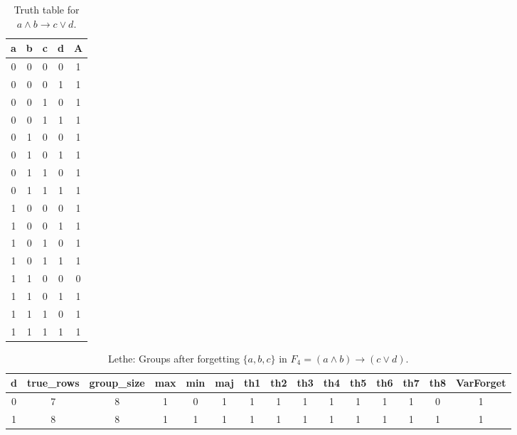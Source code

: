 \begin{table}[!tb]
    \centering
    \begin{tabular}{|c|c|c|c|c|}
        \hline
        \textbf{a} & \textbf{b} & \textbf{c} & \textbf{d} & \textbf{A} \\ \hline
        0 & 0 & 0 & 0 & 1 \\ \hline
        0 & 0 & 0 & 1 & 1 \\ \hline
        0 & 0 & 1 & 0 & 1 \\ \hline
        0 & 0 & 1 & 1 & 1 \\ \hline
        0 & 1 & 0 & 0 & 1 \\ \hline
        0 & 1 & 0 & 1 & 1 \\ \hline
        0 & 1 & 1 & 0 & 1 \\ \hline
        0 & 1 & 1 & 1 & 1 \\ \hline
        1 & 0 & 0 & 0 & 1 \\ \hline
        1 & 0 & 0 & 1 & 1 \\ \hline
        1 & 0 & 1 & 0 & 1 \\ \hline
        1 & 0 & 1 & 1 & 1 \\ \hline
        1 & 1 & 0 & 0 & 0 \\ \hline
        1 & 1 & 0 & 1 & 1 \\ \hline
        1 & 1 & 1 & 0 & 1 \\ \hline
        1 & 1 & 1 & 1 & 1 \\ \hline
    \end{tabular}
    \caption{Truth table for $a \land b \rightarrow c \lor d$.}
    \label{tab:truthtab}
\end{table}

\begin{table}[!tb]
    \centering
    \begin{tabular}{|c|c|c|c|c|c|c|c|c|c|c|c|c|c|c|}
        \hline
        \textbf{d} & \textbf{true\_rows} & \textbf{group\_size} & \textbf{max} & \textbf{min} & \textbf{maj} & \textbf{th1} & \textbf{th2} & \textbf{th3} & \textbf{th4} & \textbf{th5} & \textbf{th6} & \textbf{th7} & \textbf{th8} & \textbf{VarForget} \\ \hline
        \rowcolor{gray!40} 0 & 7 & 8 & 1 & 0 & 1 & 1 & 1 & 1 & 1 & 1 & 1 & 1 & 0 & 1 \\ \hline
        \rowcolor{blue!40} 1 & 8 & 8 & 1 & 1 & 1 & 1 & 1 & 1 & 1 & 1 & 1 & 1 & 1 & 1 \\ \hline
    \end{tabular}
    \caption{Lethe: Groups after forgetting $\{a, b, c\}$ in $F_{4} = (a \land b) \rightarrow (c \lor d)$.}
    \label{tab:lethe-F4-abc-groups}
\end{table}
